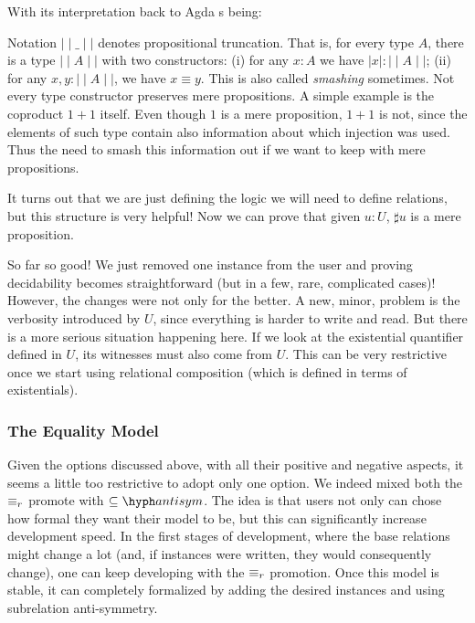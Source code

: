   
  With its interpretation back to Agda s being:
   
  
  Notation $\mid\mid\_\mid\mid$ denotes propositional truncation. That is, for every type $A$,
  there is a type $\mid\mid A \mid\mid$ with two constructors: (i) for any $x : A$ we have
  $\mid x \mid : \mid\mid A \mid\mid$; (ii) for any $x , y : \mid\mid A \mid\mid$, we have
  $x \equiv y$. This is also called \emph{smashing} sometimes. Not every type constructor 
  preserves mere propositions. A simple example is the coproduct
  $1 + 1$ itself. Even though $1$ is a mere proposition, $1 + 1$ is not, since the elements of such type
  contain also information about which injection was used. Thus the need to smash this information out
  if we want to keep with mere propositions.
  
  It turns out that we are just defining the logic we will need to define relations, but this
  structure is very helpful! Now we can prove that given $u : U$, $\sharp u$ is a mere proposition.
  
  
  So far so good! We just removed one instance from the user and proving decidability becomes
  straightforward (but in a few, rare, complicated cases)! However, the changes were not only for the better.
  A new, minor, problem is the verbosity introduced by $U$, since everything is harder to write and read.
  But there is a more serious situation happening here. If we look at the existential quantifier defined in $U$,
  its witnesses must also come from $U$. This can be very restrictive once we start using relational
  composition (which is defined in terms of existentials).

\subsubsection{The Equality Model}
  
  Given the options discussed above, with all their positive and negative aspects, it seems
  a little too restrictive to adopt only one option. We indeed mixed both the $\equiv_r$ promote
  with $\subseteq\hyph antisym$. The idea is that users not only can chose how formal they want their model
  to be, but this can significantly increase development speed. In the first stages of development, where
  the base relations might change a lot (and, if instances were written, they would consequently change),
  one can keep developing with the $\equiv_r$ promotion. Once this model is stable, it can completely
  formalized by adding the desired instances and using subrelation anti-symmetry.

